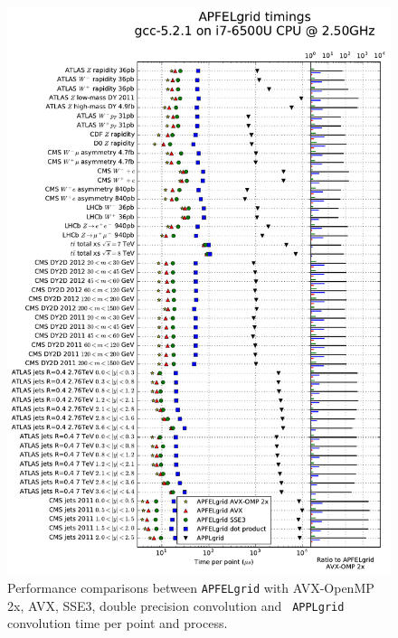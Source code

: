 \documentclass[preprint,12pt]{elsarticle}
\begin{document}

\begin{figure}
  \centering
  \includegraphics[scale=0.6]{plots/t0a}
\caption{\small Performance comparisons between {\tt APFELgrid} with
  AVX-OpenMP 2x, AVX, SSE3, double precision convolution and {\tt
    APPLgrid} convolution time per point and process.}
\label{fig:timings}
\end{figure}
\end{document}

